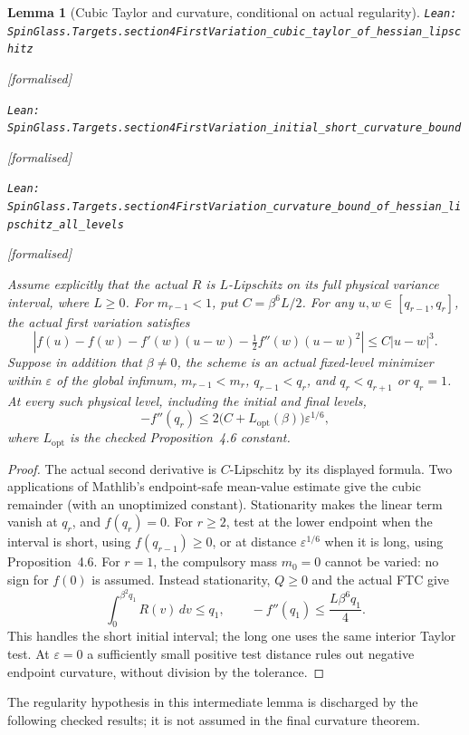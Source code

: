 \documentclass[11pt]{article}
\providecommand{\lean}[1]{\leavevmode\par\nopagebreak
  {\noindent\normalfont\footnotesize\raggedright\texttt{Lean: #1}\par}\nopagebreak}
\providecommand{\leanok}{\par\nopagebreak
  {\noindent\normalfont\footnotesize\textcolor{green!50!black}{[formalised]}\par}\nopagebreak}
\newtheorem{lemma}[theorem]{Lemma}
\begin{document}
\begin{lemma}[Cubic Taylor and curvature, conditional on actual regularity]
\lean{SpinGlass.Targets.section4FirstVariation\_cubic\_taylor\_of\_hessian\_lipschitz}\leanok
\lean{SpinGlass.Targets.section4FirstVariation\_initial\_short\_curvature\_bound}\leanok
\lean{SpinGlass.Targets.section4FirstVariation\_curvature\_bound\_of\_hessian\_lipschitz\_all\_levels}\leanok
Assume explicitly that the actual $R$ is $L$-Lipschitz on its full physical
variance interval, where $L\ge0$. For $m_{r-1}<1$, put $C=\beta^6L/2$.
For any $u,w\in[q_{r-1},q_r]$, the actual first variation satisfies
\[
 \left|f(u)-f(w)-f'(w)(u-w)-\tfrac12 f''(w)(u-w)^2\right|
 \le C|u-w|^3 .
\]
Suppose in addition that $\beta\ne0$, the scheme is an actual fixed-level
minimizer within $\varepsilon$ of the global infimum, $m_{r-1}<m_r$,
$q_{r-1}<q_r$, and $q_r<q_{r+1}$ or $q_r=1$. At every such physical level,
including the initial and final levels,
\[
 -f''(q_r)\le 2\bigl(C+L_{\mathrm{opt}}(\beta)\bigr)\varepsilon^{1/6},
\]
where $L_{\mathrm{opt}}$ is the checked Proposition~4.6 constant.
\end{lemma}
\begin{proof}
The actual second derivative is $C$-Lipschitz by its displayed formula.
Two applications of Mathlib's endpoint-safe mean-value estimate give the
cubic remainder (with an unoptimized constant). Stationarity makes the
linear term vanish at $q_r$, and $f(q_r)=0$.
For $r\ge2$, test at the lower endpoint when the interval is short, using
$f(q_{r-1})\ge0$, or at distance $\varepsilon^{1/6}$ when it is long,
using Proposition~4.6.
For $r=1$, the compulsory mass $m_0=0$ cannot be varied: no sign for $f(0)$
is assumed. Instead stationarity, $Q\ge0$ and the actual FTC give
\[
 \int_0^{\beta^2q_1}R(v)\,dv\le q_1,
 \qquad -f''(q_1)\le \frac{L\beta^6q_1}{4}.
\]
This handles the short initial interval; the long one uses the same interior
Taylor test. At $\varepsilon=0$ a sufficiently small positive test distance
rules out negative endpoint curvature, without division by the tolerance.
\end{proof}
The regularity hypothesis in this intermediate lemma is discharged by the
following checked results; it is not assumed in the final curvature theorem.
\end{document}
